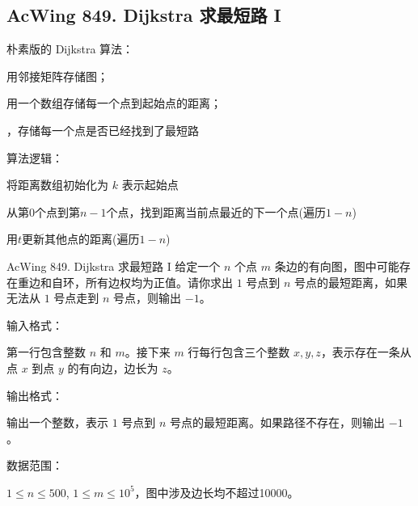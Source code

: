 \subsection{AcWing 849. Dijkstra 求最短路 I}

朴素版的 Dijkstra 算法：
\begin{myenum}
    \item 用邻接矩阵存储图；
    \item 用一个数组存储每一个点到起始点的距离；
    \item {}，存储每一个点是否已经找到了最短路
\end{myenum}

算法逻辑：
\begin{myenum}
    \item 将距离数组初始化为 $k$ 表示起始点
    \item 从第$0$个点到第$n - 1$个点，找到距离当前点最近的下一个点(遍历$1 - n$) 
    \item 用$t$更新其他点的距离(遍历$1 - n$)
\end{myenum}

\begin{titledbox}{AcWing 849. Dijkstra 求最短路 I}
    给定一个 $n$ 个点 $m$ 条边的有向图，图中可能存在重边和自环，所有边权均为正值。请你求出 $1$ 号点到 $n$ 号点的最短距离，如果无法从 $1$ 号点走到 $n$ 号点，则输出 $-1$。

    输入格式：

    第一行包含整数 $n$ 和 $m$。接下来 $m$ 行每行包含三个整数 $x,y,z$，表示存在一条从点 $x$ 到点 $y$ 的有向边，边长为 $z$。

    输出格式：

    输出一个整数，表示 $1$ 号点到 $n$ 号点的最短距离。如果路径不存在，则输出 $-1$。

    数据范围：

    $1 \le n \le 500$, $1 \le m \le 10^5$，图中涉及边长均不超过10000。

    \begin{inputblock}
         \\
         \\
         \\
    \end{inputblock}
    \begin{outputblock}
    \end{outputblock}
\end{titledbox}


